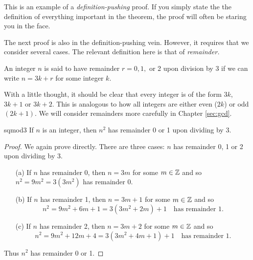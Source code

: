  This is an example of a \emph{definition-pushing} proof. If you simply state the the definition of everything important in the theorem, the proof will often be staring you in the face.


The next proof is also in the definition-pushing vein. However, it requires that we consider several cases. The relevant definition here is that of \emph{remainder.}

\begin{defn}{}{}
An integer $n$ is said to have remainder $r=0,1,$ or 2 upon division by 3 if we can write $n=3k+r$ for some integer $k$.
\end{defn}

 With a little thought, it should be clear that every integer is of the form $3k$, $3k+1$ or $3k+2$. This is analogous to how all integers are either even ($2k$) or odd $(2k+1)$. We will consider remainders more carefully in Chapter \ref{sec:gcd}.

\begin{thm}{}{sqmod3}
If $n$ is an integer, then $n^2$ has remainder 0 or 1 upon dividing by 3.
\end{thm}

\begin{proof}
We again prove directly. There are three cases: $n$ has remainder 0, 1 or 2 upon dividing by 3.
\begin{enumerate}
  \item[(a)] If $n$ has remainder 0, then $n=3m$ for some $m\in\mathbb{Z}$ and so $n^2=9m^2=3(3m^2)$ has remainder 0.
  \item[(b)] If $n$ has remainder 1, then $n=3m+1$ for some $m\in\mathbb{Z}$ and so
  \[n^2=9m^2+6m+1=3(3m^2+2m)+1\quad\text{has remainder 1.}\]
  \item[(c)] If $n$ has remainder 2, then $n=3m+2$ for some $m\in\mathbb{Z}$ and so
  \[n^2=9m^2+12m+4=3(3m^2+4m+1)+1\quad\text{has remainder 1.}\]
\end{enumerate}
Thus $n^2$ has remainder 0 or 1.
\end{proof}